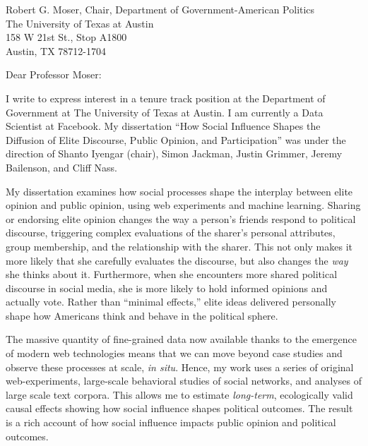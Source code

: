 \documentclass[fontsize=12pt, paper=a4]{scrlttr2}
\date{September 29, 2014}
\begin{document}
\enlargethispage{2\baselineskip}

\begin{letter}{Robert G. Moser, Chair, Department of Government-American Politics\\
The University of Texas at Austin\\
158 W 21st St., Stop A1800\\
Austin, TX 78712-1704}

\opening{Dear Professor Moser:}  %

I write to express interest in a tenure track position at the Department of Government at The University of Texas at Austin.  I am currently a Data Scientist at Facebook.  %
My dissertation ``How Social Influence Shapes the Diffusion of Elite Discourse, Public Opinion, and Participation'' was under the direction of Shanto Iyengar (chair), Simon Jackman, Justin Grimmer, Jeremy Bailenson, and Cliff Nass.

My dissertation examines how social processes shape the interplay between elite opinion and public opinion, using web experiments and machine learning.  Sharing or endorsing elite opinion changes the way a person's friends respond to political discourse, triggering complex evaluations of the sharer's personal attributes, group membership, and the relationship with the sharer.  This not only makes it more likely that she carefully evaluates the discourse, but also changes the \emph{way} she thinks about it.  Furthermore, when she encounters more shared political discourse in social media, she is more likely to hold informed opinions and actually vote.  Rather than ``minimal effects,'' elite ideas delivered personally shape how Americans think and behave in the political sphere.

The massive quantity of fine-grained data now available thanks to the emergence of modern web technologies means that we can move beyond case studies and observe these processes at scale, \emph{in situ}.  Hence, my work uses a series of original web-experiments, large-scale behavioral studies of social networks, and analyses of large scale text corpora.  This allows me to estimate \emph{long-term}, ecologically valid causal effects showing how social influence shapes political outcomes.  The result is a rich account of how social influence impacts public opinion and political outcomes.  


\end{letter}
\end{document}
